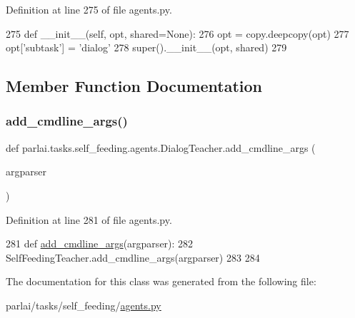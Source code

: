 Definition at line 275 of file agents.\+py.


\begin{DoxyCode}
275     \textcolor{keyword}{def }\_\_init\_\_(self, opt, shared=None):
276         opt = copy.deepcopy(opt)
277         opt[\textcolor{stringliteral}{'subtask'}] = \textcolor{stringliteral}{'dialog'}
278         super().\_\_init\_\_(opt, shared)
279 
\end{DoxyCode}


\subsection{Member Function Documentation}
\mbox{\label{classparlai_1_1tasks_1_1self__feeding_1_1agents_1_1DialogTeacher_a69b92c60fafef817217b21de44379117}} 
\subsubsection{\texorpdfstring{add\+\_\+cmdline\+\_\+args()}{add\_cmdline\_args()}}
{\footnotesize\ttfamily def parlai.\+tasks.\+self\+\_\+feeding.\+agents.\+Dialog\+Teacher.\+add\+\_\+cmdline\+\_\+args (\begin{DoxyParamCaption}\item[{}]{argparser }\end{DoxyParamCaption})\hspace{0.3cm}{\ttfamily [static]}}



Definition at line 281 of file agents.\+py.


\begin{DoxyCode}
281     \textcolor{keyword}{def }\hyperlink{namespaceparlai_1_1agents_1_1drqa_1_1config_a62fdd5554f1da6be0cba185271058320}{add\_cmdline\_args}(argparser):
282         SelfFeedingTeacher.add\_cmdline\_args(argparser)
283 
284 
\end{DoxyCode}


The documentation for this class was generated from the following file\+:\begin{DoxyCompactItemize}
\item 
parlai/tasks/self\+\_\+feeding/\hyperlink{parlai_2tasks_2self__feeding_2agents_8py}{agents.\+py}\end{DoxyCompactItemize}
